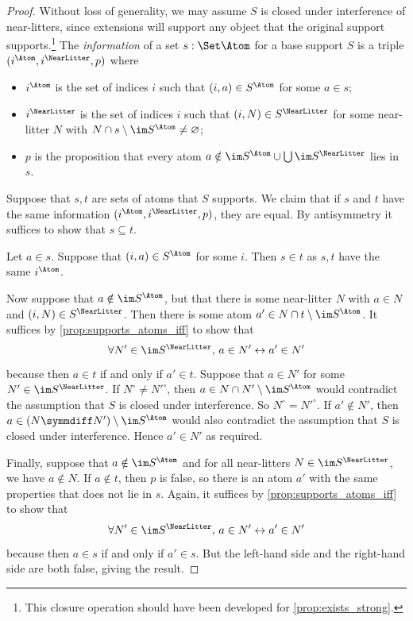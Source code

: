 \begin{proof}
  Without loss of generality, we may assume \( S \) is closed under interference of near-litters, since extensions will support any object that the original support supports.\footnote{This closure operation should have been developed for \cref{prop:exists_strong}.}
  The \emph{information} of a set \( s : \Set \Atom \) for a base support \( S \) is a triple \( (i^\Atom, i^\NearLitter, p) \) where
  \begin{itemize}
    \item \( i^\Atom \) is the set of indices \( i \) such that \( (i, a) \in S^\Atom \) for some \( a \in s \);
    \item \( i^\NearLitter \) is the set of indices \( i \) such that \( (i, N) \in S^\NearLitter \) for some near-litter \( N \) with \( N \cap s \setminus \im S^\Atom \neq \varnothing \);
    \item \( p \) is the proposition that every atom \( a \notin \im S^\Atom \cup \bigcup \im S^\NearLitter \) lies in \( s \).
  \end{itemize}
  Suppose that \( s, t \) are sets of atoms that \( S \) supports.
  We claim that if \( s \) and \( t \) have the same information \( (i^\Atom, i^\NearLitter, p) \), they are equal.
  By antisymmetry it suffices to show that \( s \subseteq t \).

  Let \( a \in s \).
  Suppose that \( (i, a) \in S^\Atom \) for some \( i \).
  Then \( s \in t \) as \( s, t \) have the same \( i^\Atom \).

  Now suppose that \( a \notin \im S^\Atom \), but that there is some near-litter \( N \) with \( a \in N \) and \( (i, N) \in S^\NearLitter \).
  Then there is some atom \( a' \in N \cap t \setminus \im S^\Atom \).
  It suffices by \cref{prop:supports_atoms_iff} to show that
  \[ \forall N' \in \im S^\NearLitter,\, a \in N' \leftrightarrow a' \in N' \]
  because then \( a \in t \) if and only if \( a' \in t \).
  Suppose that \( a \in N' \) for some \( N' \in \im S^\NearLitter \).
  If \( N^\circ \neq {N'}^\circ \), then \( a \in N \cap N' \setminus \im S^\Atom \) would contradict the assumption that \( S \) is closed under interference.
  So \( N^\circ = {N'}^\circ \).
  If \( a' \notin N' \), then \( a \in (N \symmdiff N') \setminus \im S^\Atom \) would also contradict the assumption that \( S \) is closed under interference.
  Hence \( a' \in N' \) as required.

  Finally, suppose that \( a \notin \im S^\Atom \) and for all near-litters \( N \in \im S^\NearLitter \), we have \( a \notin N \).
  If \( a \notin t \), then \( p \) is false, so there is an atom \( a' \) with the same properties that does not lie in \( s \).
  Again, it suffices by \cref{prop:supports_atoms_iff} to show that
  \[ \forall N' \in \im S^\NearLitter,\, a \in N' \leftrightarrow a' \in N' \]
  because then \( a \in s \) if and only if \( a' \in s \).
  But the left-hand side and the right-hand side are both false, giving the result.


\end{proof}
